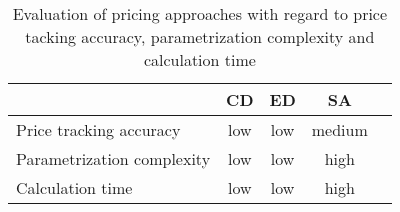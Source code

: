 \begin{table}[H]
	\setlength{\extrarowheight}{2.5pt}
	\centering
	\begin{tabular}{lcccc}
		\toprule
			 & \textbf{CD} & \textbf{ED} & \textbf{SA}\\
		\midrule
			Price tracking accuracy & \cellcolor{red!20} low & \cellcolor{red!20} low & \cellcolor{yellow!20} medium\\
			Parametrization complexity & \cellcolor{green!20} low & \cellcolor{green!20} low & \cellcolor{red!20} high\\
			Calculation time & \cellcolor{green!20} low & \cellcolor{green!20} low & \cellcolor{red!20} high\\
		\bottomrule
	\end{tabular}
	\caption[Evaluation of pricing approaches with regard to three dimensions]{Evaluation of pricing approaches with regard to price tacking accuracy, parametrization complexity and calculation time}
	\label{table:evaluationtrigger}
\end{table}







